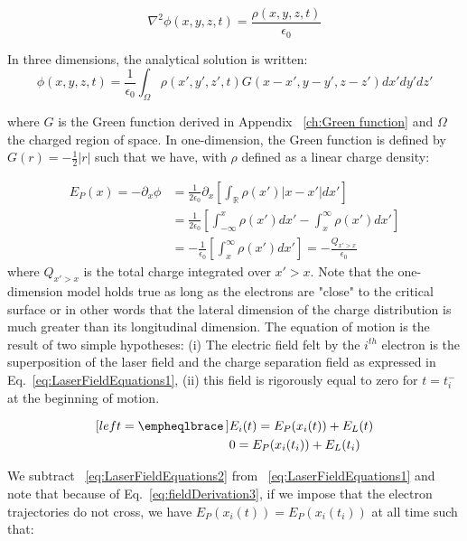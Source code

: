 \begin{equation}
\nabla^2 \phi(x,y,z,t) = \frac{\rho(x,y,z,t)}{\epsilon_0}
\end{equation}

\noindent In three dimensions, the analytical solution is written:
$$
\phi(x,y,z,t) =  \frac{1}{\epsilon_0}\int_{\Omega}\rho(x',y',z',t)G(x-x',y-y',z-z')dx'dy'dz'
$$

\noindent where $G$  is the Green function derived in Appendix ~\ref{ch:Green function}  and $\Omega$ the charged region of space. 
In one-dimension, the Green function is defined by $G(r) = -\frac{1}{2}|r|$ such that we have, with $\rho$ defined as a linear charge density:

\begin{align}
\label{eq:fieldDerivation}
E_P(x) = -\partial_x\phi & =  \frac{1}{2\epsilon_0}\partial_x[\int_{\mathbb{R}}\rho(x')|x-x'|dx'] \\
                                   & =  \frac{1}{2\epsilon_0}[\int_{-\infty}^{x}\rho(x')dx'-\int_{x}^{\infty}\rho(x')dx']\\
                                   & =  -\frac{1}{\epsilon_0}[\int_{x}^{\infty}\rho(x')dx']=  -\frac{Q_{x'>x}}{\epsilon_0} \label{eq:fieldDerivation3}
\end{align}
\noindent where $Q_{x'>x}$ is the total charge integrated over $x'>x$.
\noindent Note that the one-dimension model holds true as long as the electrons are "close" to the critical surface or in other words that the lateral dimension of the charge distribution is much greater than its longitudinal dimension. The equation of motion is the result of two simple hypotheses:
(i) The electric field felt by the $i^{th}$ electron is the superposition of the laser field and the charge separation field as expressed in Eq.~\ref{eq:LaserFieldEquations1}, (ii) this field is rigorously equal to zero for $t = t_i^{-}$ at the beginning of motion.


\begin{subequations}
\begin{align}[left = \empheqlbrace\,]
&E_i(t) = E_P(x_i(t)) + E_L(t)\label{eq:LaserFieldEquations1} \\
&0= E_P(x_i(t_i)) + E_L(t_i)\label{eq:LaserFieldEquations2}
\end{align}
\label{eq:LaserFieldEquations}
\end{subequations}


\noindent We subtract ~\ref{eq:LaserFieldEquations2} from ~\ref{eq:LaserFieldEquations1} and note that because of Eq.~\ref{eq:fieldDerivation3}, if we impose that the electron trajectories do not cross, we have $E_P(x_i(t)) = E_P(x_i(t_i))$ at all time such that:

